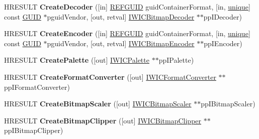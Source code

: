 \begin{DoxyCompactItemize}
\item 
\mbox{\label{interface_i_w_i_c_imaging_factory_a8e7df3a232c938f6e39b0f00b80610d0}} 
H\+R\+E\+S\+U\+LT {\bfseries Create\+Decoder} (\mbox{[}in\mbox{]} \hyperlink{struct___g_u_i_d}{R\+E\+F\+G\+U\+ID} guid\+Container\+Format, \mbox{[}in, \hyperlink{interfaceunique}{unique}\mbox{]} const \hyperlink{interface_g_u_i_d}{G\+U\+ID} $\ast$pguid\+Vendor, \mbox{[}out, retval\mbox{]} \hyperlink{interface_i_w_i_c_bitmap_decoder}{I\+W\+I\+C\+Bitmap\+Decoder} $\ast$$\ast$pp\+I\+Decoder)
\item 
\mbox{\label{interface_i_w_i_c_imaging_factory_a35e7f9f7eff3c9d0f376dbc3ffa4ead2}} 
H\+R\+E\+S\+U\+LT {\bfseries Create\+Encoder} (\mbox{[}in\mbox{]} \hyperlink{struct___g_u_i_d}{R\+E\+F\+G\+U\+ID} guid\+Container\+Format, \mbox{[}in, \hyperlink{interfaceunique}{unique}\mbox{]} const \hyperlink{interface_g_u_i_d}{G\+U\+ID} $\ast$pguid\+Vendor, \mbox{[}out, retval\mbox{]} \hyperlink{interface_i_w_i_c_bitmap_encoder}{I\+W\+I\+C\+Bitmap\+Encoder} $\ast$$\ast$pp\+I\+Encoder)
\item 
\mbox{\label{interface_i_w_i_c_imaging_factory_ae7fa85907e9992b970c5cfa2b6f1b0df}} 
H\+R\+E\+S\+U\+LT {\bfseries Create\+Palette} (\mbox{[}out\mbox{]} \hyperlink{interface_i_w_i_c_palette}{I\+W\+I\+C\+Palette} $\ast$$\ast$pp\+I\+Palette)
\item 
\mbox{\label{interface_i_w_i_c_imaging_factory_a70768d5ed2658f47104fade3acf7797b}} 
H\+R\+E\+S\+U\+LT {\bfseries Create\+Format\+Converter} (\mbox{[}out\mbox{]} \hyperlink{interface_i_w_i_c_format_converter}{I\+W\+I\+C\+Format\+Converter} $\ast$$\ast$pp\+I\+Format\+Converter)
\item 
\mbox{\label{interface_i_w_i_c_imaging_factory_af09b0d50483b8b48f14d0e0435221265}} 
H\+R\+E\+S\+U\+LT {\bfseries Create\+Bitmap\+Scaler} (\mbox{[}out\mbox{]} \hyperlink{interface_i_w_i_c_bitmap_scaler}{I\+W\+I\+C\+Bitmap\+Scaler} $\ast$$\ast$pp\+I\+Bitmap\+Scaler)
\item 
\mbox{\label{interface_i_w_i_c_imaging_factory_a20dd2e9077ab6d38e1f5a69b5ee96e22}} 
H\+R\+E\+S\+U\+LT {\bfseries Create\+Bitmap\+Clipper} (\mbox{[}out\mbox{]} \hyperlink{interface_i_w_i_c_bitmap_clipper}{I\+W\+I\+C\+Bitmap\+Clipper} $\ast$$\ast$pp\+I\+Bitmap\+Clipper)

\end{DoxyCompactItemize}
